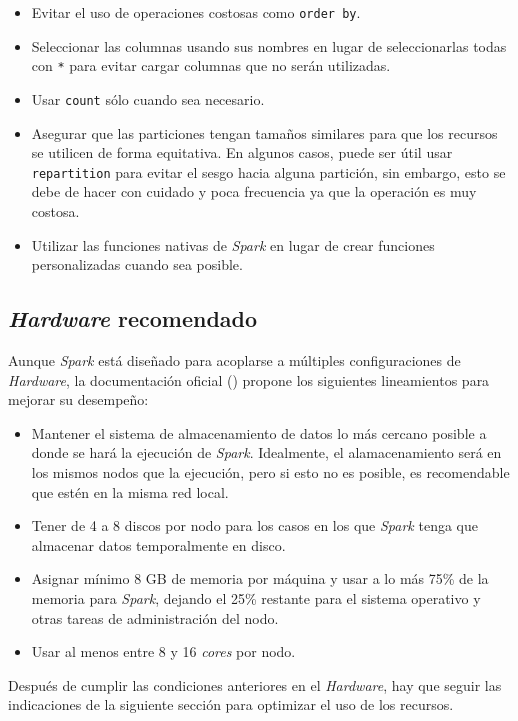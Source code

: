 \begin{itemize}
	\item Evitar el uso de operaciones costosas como \texttt{order by}. 
	\item Seleccionar las columnas usando sus nombres en lugar de seleccionarlas todas con \texttt{*} para evitar cargar columnas que no serán utilizadas.
	\item Usar \texttt{count} sólo cuando sea necesario.
	\item Asegurar que las particiones tengan tamaños similares para que los recursos se utilicen de forma equitativa. En algunos casos, puede ser útil usar \texttt{repartition} para evitar el sesgo hacia alguna partición, sin embargo, esto se debe de hacer con cuidado y poca frecuencia ya que la operación es muy costosa.
	\item Utilizar las funciones nativas de \textit{Spark} en lugar de crear funciones personalizadas cuando sea posible.
\end{itemize}

\subsection{\textit{Hardware} recomendado}

Aunque \textit{Spark} está diseñado para acoplarse a múltiples configuraciones de \textit{Hardware}, la documentación oficial (\cite{sparkhardware}) propone los siguientes lineamientos para mejorar su desempeño:
\begin{itemize}
	\item Mantener el sistema de almacenamiento de datos lo más cercano posible a donde se hará la ejecución de \textit{Spark}. Idealmente, el alamacenamiento será en los mismos nodos que la ejecución, pero si esto no es posible, es recomendable que estén en la misma red local.
	\item Tener de 4 a 8 discos por nodo para los casos en los que \textit{Spark} tenga que almacenar datos temporalmente en disco.
	\item Asignar mínimo 8 GB de memoria por máquina y usar a lo más 75\% de la memoria para \textit{Spark}, dejando el 25\% restante para el sistema operativo y otras tareas de administración del nodo.
	\item Usar al menos entre 8 y 16 \textit{cores} por nodo. 
\end{itemize}

Después de cumplir las condiciones anteriores en el \textit{Hardware}, hay que seguir las indicaciones de la siguiente sección para optimizar el uso de los recursos.


